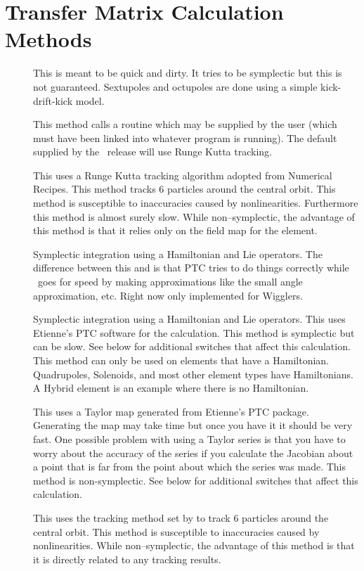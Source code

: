 \chapter{Transfer Matrix Calculation Methods}

\begin{description}

\item[]
This is meant to be quick and dirty. It tries to be symplectic but this
is not guaranteed. Sextupoles and octupoles are done using a simple
kick-drift-kick model.

\item[]
This method calls a routine  which may be supplied
by the user (which must have been linked into whatever program is
running).  The default  supplied by the \bmad\ release
will use Runge Kutta tracking. 

\item[]
This uses a Runge Kutta tracking algorithm adopted from Numerical Recipes.
This method tracks 6 particles around the central orbit. This method is
susceptible to inaccuracies caused by nonlinearities. Furthermore this method
is almost surely slow. While non--symplectic, the advantage of this method is
that it relies only on the field map for the element.

\item[]
Symplectic integration using a Hamiltonian and Lie operators. The
difference between this and  is that PTC tries to do things
correctly while \bmad\ goes for speed by making approximations like the small
angle approximation, etc. Right now only implemented for Wigglers.

\item[]
Symplectic integration using a Hamiltonian and Lie operators.
This uses Etienne's PTC software for the calculation.
This method is symplectic but can be slow. See below for additional switches
that affect this calculation. This method can only be used on elements that
have a Hamiltonian. Quadrupoles, Solenoids, and most other element types have
Hamiltonians. A Hybrid element is an example where there is no Hamiltonian.

\item[]
This uses a Taylor map generated from Etienne's PTC package. Generating
the map may take time but once you have it it should be very fast. One
possible problem with using a Taylor series is that you have to worry about
the accuracy of the series if you calculate the Jacobian about a point that is
far from the point about which the series was made. This method is
non-symplectic. See below for additional switches that affect this
calculation.

\item[]
This uses the tracking method set by  to track 6
particles around the central orbit. This method is susceptible to inaccuracies
caused by nonlinearities. While non--symplectic, the advantage of this method
is that it is directly related to any tracking results.

\end{description}

